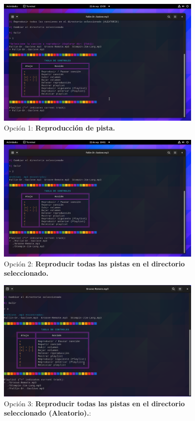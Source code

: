 \documentclass[titlepage]{article}
\begin{document}
\begin{figure}[H]
    \centering
    \includegraphics[width=0.9\textwidth]{bashmusic_1.png}
    \caption{Opción 1:  \textbf{Reproducción de pista.}}
    \label{fig:ejemplo1}
\end{figure}

\begin{figure}[H]
    \centering
    \includegraphics[width=0.9\textwidth]{bashmusic_2.png}
    \caption{Opción 2:  \textbf{Reproducir todas las pistas en el directorio seleccionado.}}
    \label{fig:ejemplo2}
\end{figure}

\begin{figure}[H]
    \centering
    \includegraphics[width=0.9\textwidth]{bashmusic_3.png}
    \caption{Opción 3:  \textbf{Reproducir todas las pistas en el directorio seleccionado (Aleatorio).}:}
    \label{fig:ejemplo3}
\end{figure}
\end{document}
